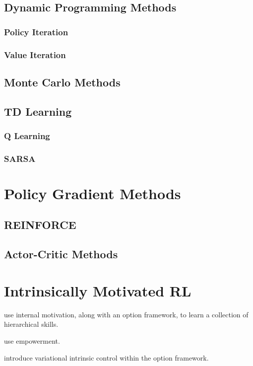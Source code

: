 \subsection{Dynamic Programming Methods}

\subsubsection{Policy Iteration}

\subsubsection{Value Iteration}

\subsection{Monte Carlo Methods}

\subsection{TD Learning}

\subsubsection{Q Learning}

\subsubsection{SARSA}



\section{Policy Gradient Methods}

\subsection{REINFORCE}

\subsection{Actor-Critic Methods}


\section{Intrinsically Motivated RL}

\cite{barto2004intrinsically} use internal motivation, along with an option framework, to learn a collection of hierarchical skills.
\newline

\noindent \cite{mohamed2015variational} use empowerment.
\newline

\noindent \cite{gregor2016variational} introduce variational intrinsic control within the option framework.

